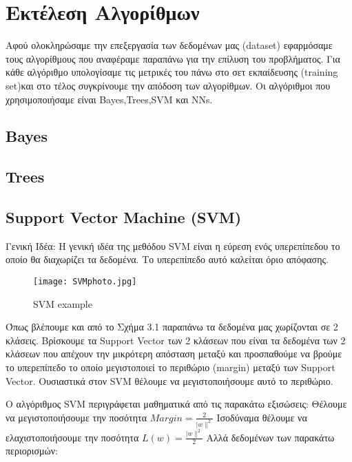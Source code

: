 
\chapter{Εκτέλεση Αλγορίθμων}

Αφού ολοκληρώσαμε την επεξεργασία των δεδομένων μας (dataset) εφαρμόσαμε τους αλγορίθμους που αναφέραμε παραπάνω για την επίλυση του προβλήματος. Για κάθε αλγόριθμο υπολογίσαμε τις μετρικές του πάνω στο σετ εκπαίδευσης (training set)και στο τέλος συγκρίνουμε την απόδοση των αλγορίθμων. Οι αλγόριθμοι που χρησιμοποιήσαμε είναι Bayes,Trees,SVM και NNs.

\section{Bayes}

\section{Trees}

\section{Support Vector Machine (SVM)}

Γενική Ιδέα:   	H γενική ιδέα της μεθόδου SVM είναι η εύρεση ενός υπερεπίπεδου το οποίο θα διαχωρίζει τα δεδομένα. Το υπερεπίπεδο αυτό καλείται όριο απόφασης. 

\begin{figure}[h!]
	\texttt{[image: SVMphoto.jpg]}
	\caption {SVM example}
	\label{fig:SVM}  
\end{figure}

Όπως βλέπουμε και από το Σχήμα 3.1 παραπάνω τα δεδομένα μας χωρίζονται σε 2 κλάσεις. Βρίσκουμε τα Support Vector των 2 κλάσεων που είναι τα δεδομένα των 2 κλάσεων που απέχουν την μικρότερη απόσταση μεταξύ και προσπαθούμε να βρούμε το υπερεπίπεδο το οποίο μεγιστοποιεί το περιθώριο (margin) μεταξύ των Support Vector. Ουσιαστικά στον SVM θέλουμε να μεγιστοποιήσουμε αυτό το περιθώριο.


Ο αλγόριθμος SVM περιγράφεται μαθηματικά από τις παρακάτω εξισώσεις:
\newline
Θέλουμε να μεγιστοποιήσουμε την ποσότητα   $ Margin=\frac{2}{|w\|^2} $
\newline
Ισοδύναμα θέλουμε να ελαχιστοποιήσουμε την ποσότητα  $ L(w)=\frac{|w\|^2}{2} $
\newline
	Αλλά δεδομένων των παρακάτω περιορισμών:


